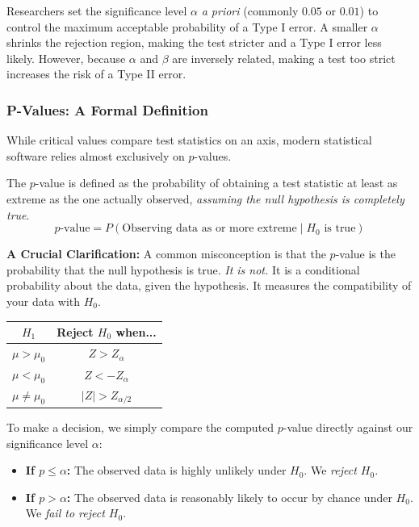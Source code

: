 \documentclass{article}
\begin{document}
Researchers set the significance level $\alpha$ \emph{a priori} (commonly $0.05$ or $0.01$) to control the maximum acceptable probability of a Type I error. A smaller $\alpha$ shrinks the rejection region, making the test stricter and a Type I error less likely. However, because $\alpha$ and $\beta$ are inversely related, making a test too strict increases the risk of a Type II error.

\subsubsection{P-Values: A Formal Definition}

While critical values compare test statistics on an axis, modern statistical software relies almost exclusively on $p$-values. 

The $p$-value is defined as the probability of obtaining a test statistic at least as extreme as the one actually observed, \emph{assuming the null hypothesis is completely true}. 
$$ p\text{-value} = P(\text{Observing data as or more extreme} \mid H_0 \text{ is true}) $$

\textbf{A Crucial Clarification:} A common misconception is that the $p$-value is the probability that the null hypothesis is true. \emph{It is not.} It is a conditional probability about the data, given the hypothesis. It measures the compatibility of your data with $H_0$. 

\begin{margintable}
\centering
\begin{tabular}{|| c c ||} 
 \hline
 $H_1$ & Reject $H_0$ when... \\ [0.5ex] 
 \hline\hline
 $\mu > \mu_0$ & $Z > Z_\alpha$ \\
 $\mu < \mu_0$ & $Z < -Z_\alpha$  \\
 $\mu \neq \mu_0$ & $|Z| > Z_{\alpha/2}$ \\ [1ex] 
 \hline
\end{tabular}
\captionsetup{justification=centering}
\caption{\label{tab:zcriticals} Rejection Regions for the $Z$-test}
\end{margintable}

To make a decision, we simply compare the computed $p$-value directly against our significance level $\alpha$:
\begin{itemize}
    \item \textbf{If $p \leq \alpha$:} The observed data is highly unlikely under $H_0$. We \emph{reject $H_0$}.
    \item \textbf{If $p > \alpha$:} The observed data is reasonably likely to occur by chance under $H_0$. We \emph{fail to reject $H_0$}.
\end{itemize}
\end{document}
